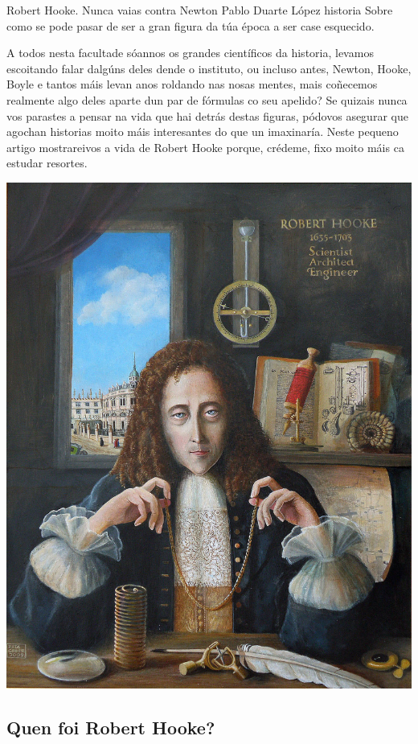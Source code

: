 \Titular%
{Robert Hooke. Nunca vaias contra Newton}%
{Pablo Duarte López}%
{historia}%
{Sobre como se pode pasar de ser a gran figura da túa época a ser case esquecido.}

\begin{refsection}
\begin{multicols}{2}


A todos nesta facultade sóannos os grandes científicos da historia, levamos
escoitando falar dalgúns deles dende o instituto, ou incluso antes, Newton,
Hooke, Boyle e tantos máis levan anos roldando nas nosas mentes, mais coñecemos
realmente algo deles aparte dun par de fórmulas co seu apelido? Se quizais
nunca vos parastes a pensar na vida que hai detrás destas figuras, pódovos
asegurar que agochan historias moito máis interesantes do que un imaxinaría.
Neste pequeno artigo mostrareivos a vida de Robert Hooke porque, crédeme, fixo
moito máis ca estudar resortes.

\begin{center}
    \includegraphics[width=0.7\linewidth]{revistas/002/imaxes/17_Robert_Hooke_Engineer.jpg}
\end{center}

\subsection*{Quen foi Robert Hooke?}


\end{multicols}
\end{refsection}
